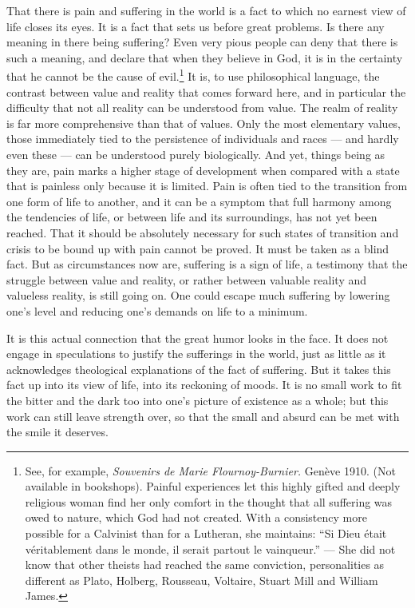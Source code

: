 \documentclass[12pt]{book}
\newcommand{\opage}[1]{\marginnote{\footnotesize\textit{[#1]}}}
\begin{document}
\opage{91}That there is pain and suffering in the world is a fact to which no earnest
view of life closes its eyes. It is a fact that sets us before great problems. Is there
any meaning in there being suffering? Even very pious people can deny that there is
such a meaning, and declare that when they believe in God, it is in the certainty that
he cannot be the cause of evil.\footnote{See, for example, \textit{Souvenirs de Marie
Flournoy-Burnier.} Genève 1910. (Not available in bookshops). Painful experiences let
this highly gifted and deeply religious woman find her only comfort in the thought that
all suffering was owed to nature, which God had not created. With a consistency more
possible for a Calvinist than for a Lutheran, she maintains: ``Si Dieu était
véritablement dans le monde, il serait partout le vainqueur.'' --- She did not know that
other theists had reached the same conviction, personalities as different as Plato,
Holberg, Rousseau, Voltaire, Stuart Mill and William James.} It is, to use
philosophical language, the contrast between value and reality that comes forward here,
and in particular the difficulty that not all reality can be understood from value. The
realm of reality is far more comprehensive than that of values. Only the most elementary
values, those immediately tied to the persistence of individuals and races --- and
hardly even these --- can be understood purely biologically. And yet, things being as
they are, pain marks a higher stage of development when compared with a state that is
painless only because it is limited. Pain is often tied to the transition from one form
of life to another, and it can be a symptom that full harmony among the tendencies of
life, or between life and its surroundings, has not yet been reached. That it should be
absolutely necessary for such states of transition and crisis to be bound up with pain
cannot be proved. It must be taken as a blind fact. But as circumstances now are,
suffering is a sign of life, a testimony that the struggle between value and reality,
or rather between valuable reality and valueless reality, is still going on. One could
escape much suffering by lowering one's level and reducing one's demands on life to a
minimum.

It is this actual connection that the great humor looks in the face. It does not
engage in speculations to \opage{92}justify the sufferings in the world, just as little
as it acknowledges theological explanations of the fact of suffering. But it takes this
fact up into its view of life, into its reckoning of moods. It is no small work to fit
the bitter and the dark too into one's picture of existence as a whole; but this work
can still leave strength over, so that the small and absurd can be met with the smile
it deserves.
\end{document}
